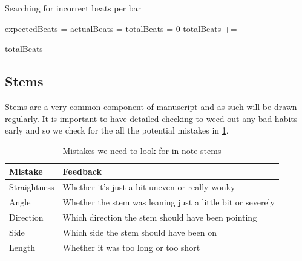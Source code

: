 \begin{algorithm}[H]
  \caption{Searching for incorrect beats per bar}
  \label{alg:bar-beat-check}

  \begin{algorithmic}
          \State expectedBeats = 
          \State actualBeats = 
          \EndIf
        \EndFor
    \EndProcedure
    \Statex
        \State totalBeats = 0
          \State totalBeats += 
        \EndFor

        \Return totalBeats
    \EndProcedure
  \end{algorithmic}
\end{algorithm}

\subsection{Stems}

Stems are a very common component of manuscript and as such will be drawn regularly. It is important to have detailed checking to weed out any bad habits early and so we check for the all the potential mistakes in \cref{table:stem-mistakes}.

\begin{table}[H]
    \renewcommand{\arraystretch}{1.6}
    \begin{tabularx}{\textwidth}{ lX }
        \toprule
        Mistake & Feedback \\
        \midrule
        Straightness & Whether it's just a bit uneven or really wonky \\
        Angle & Whether the stem was leaning just a little bit or severely \\
        Direction & Which direction the stem should have been pointing \\
        Side & Which side the stem should have been on \\
        Length & Whether it was too long or too short\\
        \bottomrule
    \end{tabularx}

    \caption{Mistakes we need to look for in note stems}
    \label{table:stem-mistakes}
\end{table}

